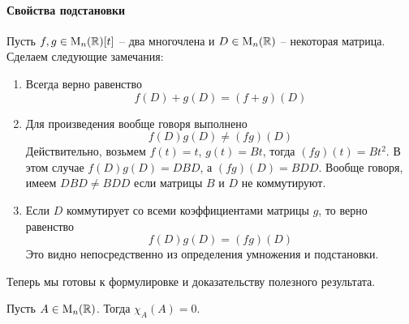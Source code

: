 \paragraph{Свойства подстановки}

Пусть $f,g\in\operatorname{M}_{n}(\mathbb R)[t]$ -- два многочлена и $D\in\operatorname{M}_{n}(\mathbb R)$ -- некоторая матрица.
Сделаем следующие замечания:
\begin{enumerate}
\item Всегда верно равенство
\[
f(D) + g(D) = (f + g)(D)
\]

\item Для произведения вообще говоря выполнено
\[
f(D)g(D)\neq (fg)(D)
\]
Действительно, возьмем $f(t) = t$, $g(t) = Bt$, тогда $(fg)(t) = Bt^2$.
В этом случае $f(D)g(D) = DBD$, а $(fg)(D) = BDD$.
Вообще говоря, имеем $DBD \neq BDD$ если матрицы $B$ и $D$ не коммутируют.

\item Если $D$ коммутирует со всеми коэффициентами матрицы $g$, то верно равенство
\[
f(D)g(D) = (fg)(D)
\]
Это видно непосредственно из определения умножения и подстановки.
\end{enumerate}

Теперь мы готовы к формулировке и доказательству полезного результата.

\begin{claim}
\label{claim::HamiltoCaly}
Пусть $A\in\operatorname{M}_{n}(\mathbb R)$.
Тогда $\chi_A(A) = 0$.
\end{claim}

